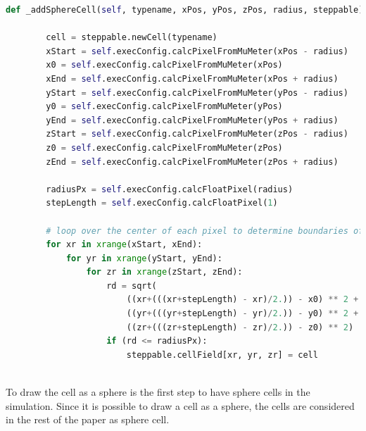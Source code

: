 \begin{lstlisting}[language=Python, caption = {[Created function to draw a sphere cell] Function to draw a cell as a sphere. First all required points for the calculation are converted into the voxel unit. Then it is iterated over each of the three axes. During these iterations for each voxel the distance to the center of the cuboid and sphere is calculated and then it is checked if the voxel is within the sphere or not. If the voxel is a part of the sphere it will be added to the sphere.}, label=lst:addSphereCell]
    def _addSphereCell(self, typename, xPos, yPos, zPos, radius, steppable):
    
        cell = steppable.newCell(typename)
        xStart = self.execConfig.calcPixelFromMuMeter(xPos - radius)
        x0 = self.execConfig.calcPixelFromMuMeter(xPos)
        xEnd = self.execConfig.calcPixelFromMuMeter(xPos + radius)
        yStart = self.execConfig.calcPixelFromMuMeter(yPos - radius)
        y0 = self.execConfig.calcPixelFromMuMeter(yPos)
        yEnd = self.execConfig.calcPixelFromMuMeter(yPos + radius)
        zStart = self.execConfig.calcPixelFromMuMeter(zPos - radius)
        z0 = self.execConfig.calcPixelFromMuMeter(zPos)
        zEnd = self.execConfig.calcPixelFromMuMeter(zPos + radius)

        radiusPx = self.execConfig.calcFloatPixel(radius)
        stepLength = self.execConfig.calcFloatPixel(1)
        
        # loop over the center of each pixel to determine boundaries of the circle
        for xr in xrange(xStart, xEnd):
            for yr in xrange(yStart, yEnd):
                for zr in xrange(zStart, zEnd):
                    rd = sqrt(
                        ((xr+(((xr+stepLength) - xr)/2.)) - x0) ** 2 +
                        ((yr+(((yr+stepLength) - yr)/2.)) - y0) ** 2 +
                        ((zr+(((zr+stepLength) - zr)/2.)) - z0) ** 2)
                    if (rd <= radiusPx):
                        steppable.cellField[xr, yr, zr] = cell
                        
\end{lstlisting}

To draw the cell as a sphere is the first step to have sphere cells in the simulation. Since it is possible to draw a cell as a sphere, the cells are considered in the rest of the paper as sphere cell. 


